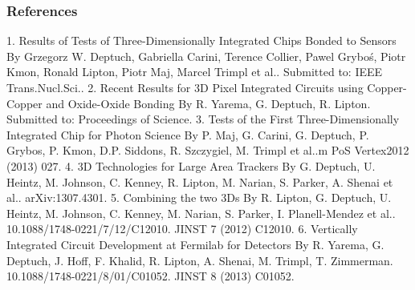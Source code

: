 \subsubsection{References}
1.  Results of Tests of Three-Dimensionally Integrated Chips Bonded to Sensors
By Grzegorz W. Deptuch, Gabriella Carini, Terence Collier, Pawel Gryboś, Piotr Kmon, Ronald Lipton, Piotr Maj, Marcel Trimpl et al..
Submitted to: IEEE Trans.Nucl.Sci..
2.  Recent Results for 3D Pixel Integrated Circuits using Copper-Copper and Oxide-Oxide Bonding By R. Yarema, G. Deptuch, R. Lipton.
Submitted to: Proceedings of Science.
3.  Tests of the First Three-Dimensionally Integrated Chip for Photon Science
By P. Maj, G. Carini, G. Deptuch, P. Grybos, P. Kmon, D.P. Siddons, R. Szczygiel, M. Trimpl et al..m PoS Vertex2012 (2013) 027.
4.  3D Technologies for Large Area Trackers
By G. Deptuch, U. Heintz, M. Johnson, C. Kenney, R. Lipton, M. Narian, S. Parker, A. Shenai et al.. arXiv:1307.4301.
5.  Combining the two 3Ds
By R. Lipton, G. Deptuch, U. Heintz, M. Johnson, C. Kenney, M. Narian, S. Parker, I. Planell-Mendez et al.. 10.1088/1748-0221/7/12/C12010.
JINST 7 (2012) C12010.
6.  Vertically Integrated Circuit Development at Fermilab for Detectors
By R. Yarema, G. Deptuch, J. Hoff, F. Khalid, R. Lipton, A. Shenai, M. Trimpl, T. Zimmerman.
10.1088/1748-0221/8/01/C01052.
JINST 8 (2013) C01052.
